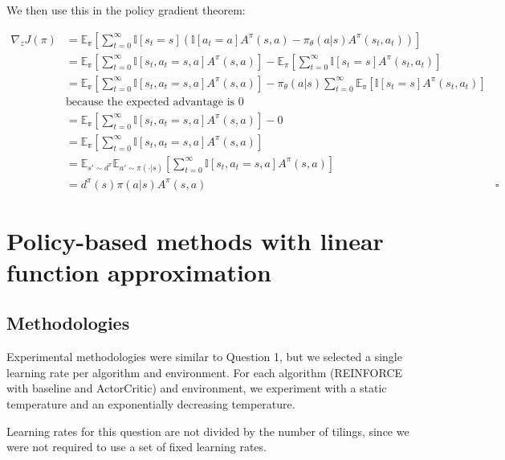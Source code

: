 \documentclass{article}
\newcommand{\grad}{\nabla}
\begin{document}
We then use this in the policy gradient theorem:

\begin{align*}
  \grad_z J(\pi) &= \mathbb{E_\pi} \left [ \sum_{t=0}^\infty \mathbb{I}[ s_t = s] \left ( \mathbb{I}[a_t = a] A^{\pi}(s,a) - \pi_\theta(a|s)A^{\pi} (s_t, a_t) \right) \right]\\
                 &= \mathbb{E_\pi} \left [ \sum_{t=0}^\infty \mathbb{I}[s_t, a_t = s, a] A^\pi (s,a) \right] - \mathbb{E}_\pi \left [ \sum _{t=0}^{\infty} \mathbb{I} [s_t = s] A^{\pi} (s_t, a_t)\right]\\
                 &= \mathbb{E_\pi} \left [ \sum_{t=0}^\infty \mathbb{I}[s_t, a_t = s, a] A^\pi (s,a) \right] - \pi_\theta(a|s) \sum_{t=0}^\infty \mathbb{E_\pi} [\mathbb{I}[s_t = s] A^\pi (s_t, a_t)]\\
                 &\text{because the expected advantage is 0}\\
                 &= \mathbb{E_\pi} \left [ \sum_{t=0}^\infty \mathbb{I}[s_t, a_t = s, a] A^\pi (s,a) \right] - 0 \\
                 &= \mathbb{E_\pi} \left [ \sum_{t=0}^\infty \mathbb{I}[s_t, a_t = s, a] A^\pi (s,a) \right]\\
                 &= \mathbb{E}_{s' \sim d^\pi} \mathbb{E}_{a' \sim \pi(\cdot | s)} \left [ \sum_{t=0}^\infty \mathbb{I}[s_t, a_t = s, a] A^\pi (s,a) \right]\\
                 &= d^\pi(s) \pi(a|s) A^\pi(s,a) &\square
\end{align*}

\section{Policy-based methods with linear function approximation}

\subsection{Methodologies}

Experimental methodologies were similar to Question 1, but we selected a single learning rate per
algorithm and environment. For each algorithm (REINFORCE with baseline and ActorCritic) and environment, we experiment with a static temperature and an
exponentially decreasing temperature.

Learning rates for this question are not divided by the number of tilings, since we were not
required to use a set of fixed learning rates.
\end{document}
